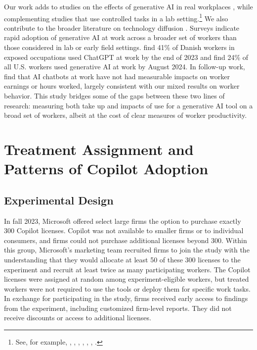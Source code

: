 \documentclass{article}
\begin{document}
Our work adds to studies on the effects of generative AI in real workplaces \citep{brynjolfsson2023generative,cui2024impact,otis2023uneven}, while complementing studies that use controlled tasks in a lab setting.\footnote{See, for example, \cite{peng2023impact}, \cite{Spatharioti2024search}, \cite{vaithilingam2022expectation}, \cite{campero2022}, \cite{noy2023experimental}, \cite{dell2023navigating}, \cite{cambon2023early}.} We also contribute to the broader literature on technology diffusion \citep{comin2010exploration,forman2018technology}. Surveys indicate rapid adoption of generative AI at work across a broader set of workers than those considered in lab or early field settings. \cite{humlum2025unequal} find 41\% of Danish workers in exposed occupations used ChatGPT at work by the end of 2023 and \cite{blandin2024rapid} find 24\% of all U.S. workers used generative AI at work by August 2024. In follow-up work, \cite{humlum2025large} find that AI chatbots at work have not had measurable impacts on worker earnings or hours  worked, largely consistent with our mixed results on worker behavior. This study bridges some of the gaps between these two lines of research: measuring both take up and impacts of use for a generative AI tool on a broad set of workers, albeit at the cost of clear measures of worker productivity.  


\section{Treatment Assignment and Patterns of Copilot Adoption}

\subsection{Experimental Design}

In fall 2023, Microsoft offered select large firms the option to purchase exactly 300 Copilot licenses. Copilot was not available to smaller firms or to individual consumers, and firms could not purchase additional licenses beyond 300. Within this group, Microsoft's marketing team recruited firms to join the study with the understanding that they would allocate at least 50 of these 300 licenses to the experiment and recruit at least twice as many participating workers. The Copilot licenses were assigned at random among experiment-eligible workers, but treated workers were not required to use the tools or deploy them for specific work tasks. In exchange for participating in the study, firms received early access to findings from the experiment, including customized firm-level reports. They did not receive discounts or access to additional licenses. 
\end{document}
